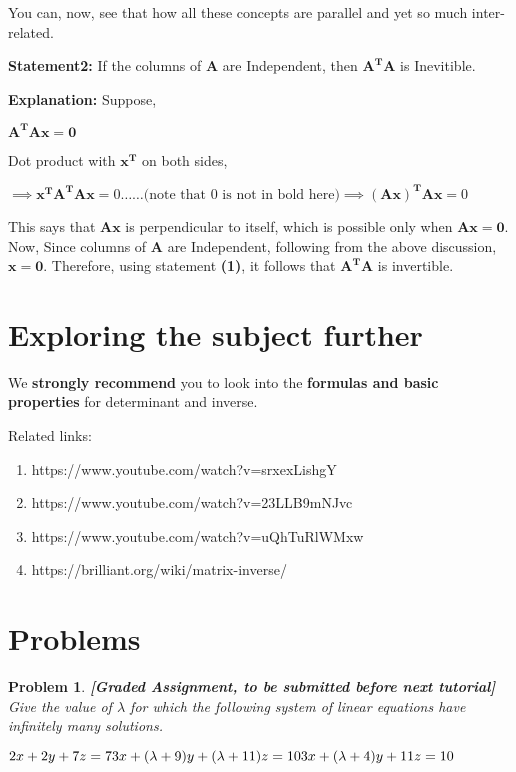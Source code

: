 \documentclass[a4paper]{article}
\newtheorem{problem}{Problem}
\begin{document}
You can, now, see that how all these concepts are parallel and yet so much inter-related. 

\textbf{Statement2: }If the columns of $\mathbf{A}$ are Independent, then $\mathbf{A^{T}A}$ is Inevitible.

\textbf{Explanation: }Suppose,
\begin{center}
    $\mathbf{A^TAx} = \mathbf{0}$
\end{center}
Dot product with $\mathbf{x^T}$ on both sides,
\begin{center}
    $
    \implies \mathbf{x^TA^TAx} = 0 \dots\dots \textrm{(note that 0 is not in bold here)}

    \implies \mathbf{(Ax)^TAx} = 0
    $
\end{center}

This says that $\mathbf{Ax}$ is perpendicular to itself, which is possible only when $\mathbf{Ax} = \mathbf{0}$. Now, Since columns of $\mathbf{A}$ are Independent, following from the above discussion, $\mathbf{x} = \mathbf{0}$. Therefore, using statement \textbf{(1)}, it follows that $\mathbf{A^TA}$ is invertible.

\newpage
\section{Exploring the subject further}
We \textbf{strongly recommend} you to look into the \textbf{formulas and basic properties} for determinant and inverse.

Related links:
\begin{enumerate}
    \item https://www.youtube.com/watch?v=srxexLishgY
    \item https://www.youtube.com/watch?v=23LLB9mNJvc
    \item https://www.youtube.com/watch?v=uQhTuRlWMxw
    \item https://brilliant.org/wiki/matrix-inverse/
\end{enumerate}

\section{Problems}
\begin{problem}
    
    \textbf{[Graded Assignment, to be submitted before next tutorial]} Give the value of $\lambda$ for which the following system of linear equations have infinitely many solutions.
    \begin{center}
        $
        2x + 2y + 7z = 7\\
        3x + (\lambda+9)y + (\lambda+11)z = 10 \\
        3x + (\lambda+4)y + 11z = 10
        $
    \end{center}
\end{problem}
\end{document}
